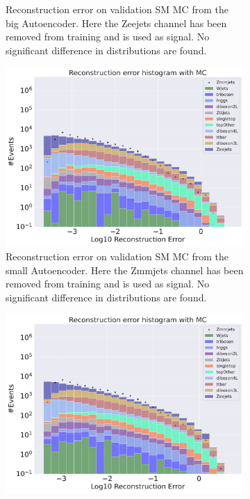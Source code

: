 \begin{figure}[h!]
\begin{subfigure}{.45\textwidth}
        \caption{Reconstruction error on validation SM MC from the big Autoencoder. Here the Zeejets channel has been removed from training and 
        is used as signal. No significant difference in distributions are found. }
        \label{fig:ae_big_Zeejets}
    \end{subfigure}
    \hfill 
    \begin{subfigure}{.45\textwidth}
        \includegraphics[width=\textwidth]{Figures/AE_testing/small/b_data_recon_big_rm3_feats_sig_Zmmjets.pdf}
        \caption{Reconstruction error on validation SM MC from the small Autoencoder. Here the Zmmjets channel has been removed from training and 
        is used as signal. No significant difference in distributions are found. }
        \label{fig:ae_small_Zmmjets}
    \end{subfigure}
    \hfill
    \begin{subfigure}{.45\textwidth}
        \includegraphics[width=\textwidth]{Figures/AE_testing/big/b_data_recon_big_rm3_feats_sig_Zmmjets.pdf}

\end{subfigure}
\end{figure}
